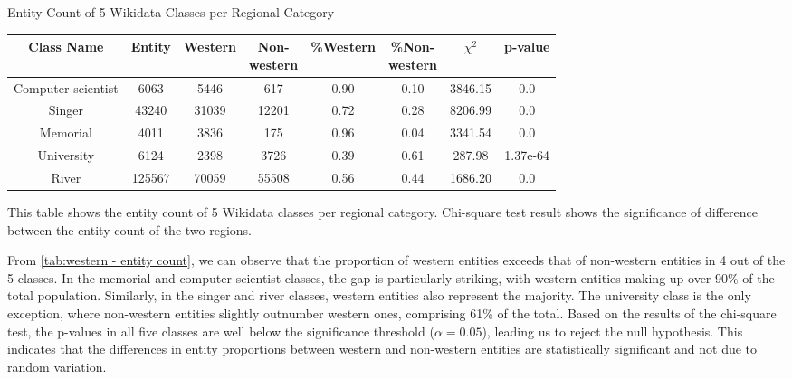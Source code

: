 
\begin{center}
\scriptsize
\begin{threeparttable}
\captionsetup{font=small}
\caption{Entity Count of 5 Wikidata Classes per Regional Category}
\label{tab:western - entity count}
\begin{tabular}{c | c c c c c c c} 

\toprule
    Class Name & Entity & Western & \CellWithForceBreak{Non- \\ western} & \%Western & \CellWithForceBreak{\%Non- \\ western}& $\chi^2$ & p-value \\ [0.5ex] 
\midrule
    Computer scientist & 6063 & 5446 & 617 & 0.90 & 0.10 & 3846.15 & 0.0 \\
    Singer & 43240 & 31039 & 12201 & 0.72 & 0.28 & 8206.99 & 0.0 \\
    Memorial & 4011 & 3836 & 175 & 0.96 & 0.04 & 3341.54 & 0.0 \\
    University & 6124 & 2398 & 3726 & 0.39 & 0.61 & 287.98 & 1.37e-64 \\
    River & 125567 & 70059 & 55508 & 0.56 & 0.44 & 1686.20 & 0.0 \\
    [1ex]
\bottomrule
\end{tabular}
\begin{tablenotes}
    \scriptsize
    \item{This table shows the entity count of 5 Wikidata classes per regional category. Chi-square test result shows the significance of difference between the entity count of the two regions.}
\end{tablenotes}
\end{threeparttable}
\end{center}

From \autoref{tab:western - entity count}, we can observe that the proportion of western entities exceeds that of non-western entities in 4 out of the 5 classes. In the memorial and computer scientist classes, the gap is particularly striking, with western entities making up over 90\% of the total population. Similarly, in the singer and river classes, western entities also represent the majority. The university class is the only exception, where non-western entities slightly outnumber western ones, comprising 61\% of the total. Based on the results of the chi-square test, the p-values in all five classes are well below the significance threshold ($\alpha = 0.05$), leading us to reject the null hypothesis. This indicates that the differences in entity proportions between western and non-western entities are statistically significant and not due to random variation.

